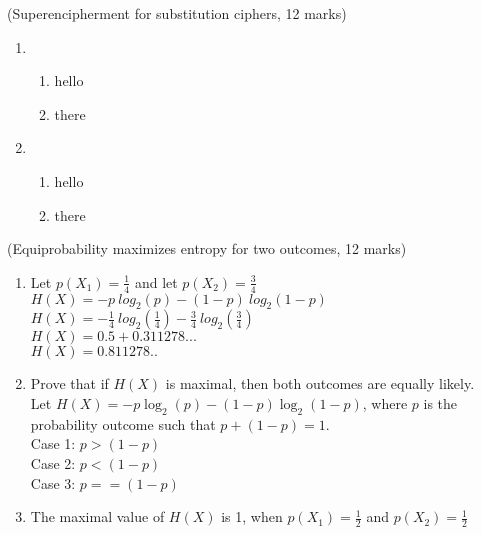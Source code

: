 \documentclass{assignment}
\begin{document}
\begin{problemlist}
\pbitem (Superencipherment for substitution ciphers, 12 marks)
\begin{problem}
\begin{answer}
\begin{enumerate}[label=(\alph*)]
	\item	\begin{enumerate}[label=(\roman*)]
			\item hello
			\item there
			\end{enumerate}
			
	\item 	\begin{enumerate}[label=(\roman*)]
			\item hello
			\item there
			\end{enumerate}
\end{enumerate}
\end{answer}
\end{problem}

\pbitem (Equiprobability maximizes entropy for two outcomes, 12 marks)
\begin{problem}
\begin{answer}
\begin{enumerate}[label=(\alph*)]
	\item	Let $ p(X_1) = \frac{1}{4} $ and let $ p(X_2) = \frac{3}{4} $	\\
			$H(X) = -p \ log_2(p) -(1-p) \ log_2(1-p) $ \\
			$H(X) = -\frac{1}{4} \ log_2(\frac{1}{4}) -\frac{3}{4} \ log_2(\frac{3}{4}) $ \\
			$H(X) = 0.5 + 0.311278...$ \\
			$H(X) = 0.811278.. $
			
	\item 	Prove that if $H(X)$ is maximal, then both outcomes are equally likely. \\
			Let $H(X) = -p \log_2 (p) - (1-p) \log_2 (1-p)$, where $p$ is the probability 
			outcome such that $p + (1-p) = 1$. \\
			Case 1: $ p > (1- p) $\\
			Case 2: $ p < (1- p) $\\
			Case 3: $ p == (1- p) $\\
		
			
	\item 	The maximal value of $H(X)$ is 1, when $p(X_1) = \frac{1}{2}$ and $p(X_2) = \frac{1}{2}$
\end{enumerate}
\end{answer}
\end{problem}


\end{problemlist}
\end{document}
